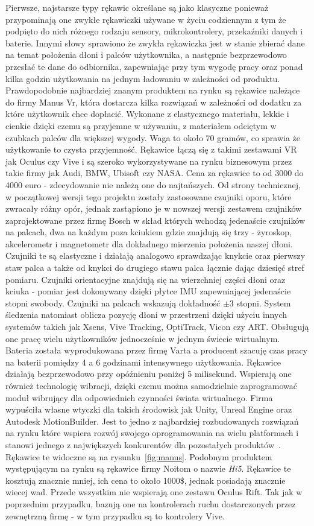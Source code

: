 	Pierwsze, najstarsze typy rękawic określane są jako klasyczne ponieważ przypominają one zwykłe rękawiczki używane w życiu codziennym z tym że podpięto do nich różnego rodzaju sensory, mikrokontrolery, przekaźniki danych i baterie. Innymi słowy sprawiono że zwykła rękawiczka jest w stanie zbierać dane na temat położenia dłoni i palców użytkownika, a następnie bezprzewodowo przesłać te dane do odbiornika, zapewniając przy tym wygodę pracy oraz ponad kilka godzin użytkowania na jednym ładowaniu w zależności od produktu. Prawdopodobnie najbardziej znanym produktem na rynku są rękawice należące do firmy Manus Vr, która dostarcza kilka rozwiązań w zależności od dodatku za które użytkownik chce dopłacić. Wykonane z elastycznego materiału, lekkie i cienkie dzięki czemu są przyjemne w używaniu, z materiałem odciętym w czubkach palców dla większej wygody. Waga to około 70 gramów, co sprawia że użytkowanie to czysta przyjemność. Rękawice łączą się z takimi zestawami VR jak Oculus czy Vive i są szeroko wykorzystywane na rynku biznesowym przez takie firmy jak Audi, BMW, Ubisoft czy NASA. Cena za rękawice to od 3000 do 4000 euro - zdecydowanie nie należą one do najtańszych. Od strony technicznej, w początkowej wersji tego projektu zostały zastosowane czujniki oporu, które zwracały różny opór, jednak zastąpiono je w nowszej wersji zestawem  czujników zaprojektowane przez firmę Bosch w skład których wchodzą jedenaście czujników na palcach, dwa na każdym poza kciukiem gdzie znajdują się trzy - żyroskop, akcelerometr i magnetometr dla dokładnego mierzenia położenia naszej dłoni. Czujniki te są elastyczne i działają analogowo sprawdzając knykcie oraz pierwszy staw palca a także od knykci do drugiego stawu palca łącznie dając dziesięć stref pomiaru. Czujniki orientacyjne znajdują się na wierzchniej części dłoni oraz kciuka - pomiar jest dokonywany dzięki płytce IMU zapewniającej jedenaście stopni swobody. Czujniki na palcach wskazują dokładność $\pm 3$ stopni. System śledzenia natomiast oblicza pozycję dłoni w przestrzeni dzięki użyciu innych systemów takich jak Xsens, Vive Tracking, OptiTrack, Vicon czy ART. Obsługują one pracę wielu użytkowników jednocześnie w jednym świecie wirtualnym. Bateria została wyprodukowana przez firmę Varta a producent szacuję czas pracy na baterii pomiędzy 4 a 6 godzinami intensywnego użytkowania. Rękawice działają bezprzewodowo przy opóźnieniu poniżej 5 milisekund. Wspierają one również technologię wibracji, dzięki czemu można samodzielnie zaprogramować moduł wibrujący dla odpowiednich czynności świata wirtualnego. Firma wypuściła własne wtyczki dla takich środowisk jak Unity, Unreal Engine oraz Autodesk MotionBuilder. Jest to jedno z najbardziej rozbudowanych rozwiązań na rynku które wspiera rozwój swojego oprogramowania na wielu platformach i stanowi jednego z największych konkurentów dla pozostałych produktów~\cite{manus}. Rękawice te widoczne są na rysunku~\ref{fig:manus}. Podobnym produktem występującym na rynku są rękawice firmy Noitom o nazwie \textit{Hi5}. Rękawice te kosztują znacznie mniej, ich cena to około 1000\$, jednak posiadają znacznie wiecej wad. Przede wszystkim nie wspierają one zestawu Oculus Rift. Tak jak w poprzednim przypadku, bazują one na kontrolerach ruchu dostarczonych przez zewnętrzną firmę - w tym przypadku są to kontrolery Vive. 